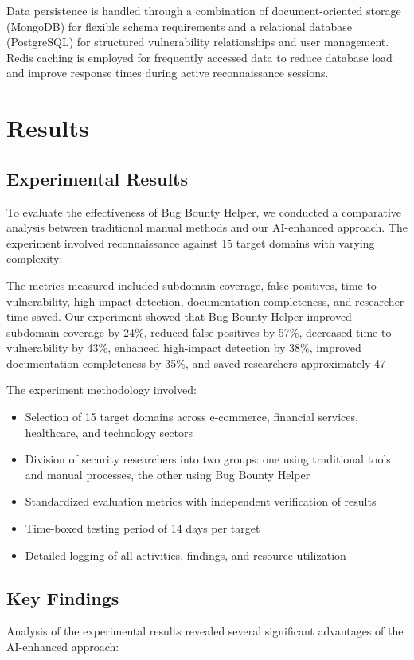 \documentclass[conference]{IEEEtran}
\begin{document}
Data persistence is handled through a combination of document-oriented storage (MongoDB) for flexible schema requirements and a relational database (PostgreSQL) for structured vulnerability relationships and user management. Redis caching is employed for frequently accessed data to reduce database load and improve response times during active reconnaissance sessions.

\section{Results}
\subsection{Experimental Results}
To evaluate the effectiveness of Bug Bounty Helper, we conducted a comparative analysis between traditional manual methods and our AI-enhanced approach. The experiment involved reconnaissance against 15 target domains with varying complexity:

The metrics measured included subdomain coverage, false positives, time-to-vulnerability, high-impact detection, documentation completeness, and researcher time saved. Our experiment showed that Bug Bounty Helper improved subdomain coverage by 24\%, reduced false positives by 57\%, decreased time-to-vulnerability by 43\%, enhanced high-impact detection by 38\%, improved documentation completeness by 35\%, and saved researchers approximately 47%

The experiment methodology involved:
\begin{itemize}
    \item Selection of 15 target domains across e-commerce, financial services, healthcare, and technology sectors
    \item Division of security researchers into two groups: one using traditional tools and manual processes, the other using Bug Bounty Helper
    \item Standardized evaluation metrics with independent verification of results
    \item Time-boxed testing period of 14 days per target
    \item Detailed logging of all activities, findings, and resource utilization
\end{itemize}

\subsection{Key Findings}
Analysis of the experimental results revealed several significant advantages of the AI-enhanced approach:
\end{document}

